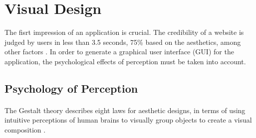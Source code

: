 \section{Visual Design}

The fisrt impression of an application is crucial. The credibility of a website is judged by users in less than 3.5 seconds, 75\% based on the aesthetics, among other factors \parencite[cf.][1]{Alsudani.2009}. In order to generate a graphical user interface (GUI) for the application, the psychological effects of perception must be taken into account.


\subsection{Psychology of Perception}

\paragraph*{} 
The Gestalt theory describes eight laws for aesthetic designs, in terms of using intuitive perceptions of human brains to visually group objects to create a visual composition \parencite[cf.][113]{Sternberg.2012}.

